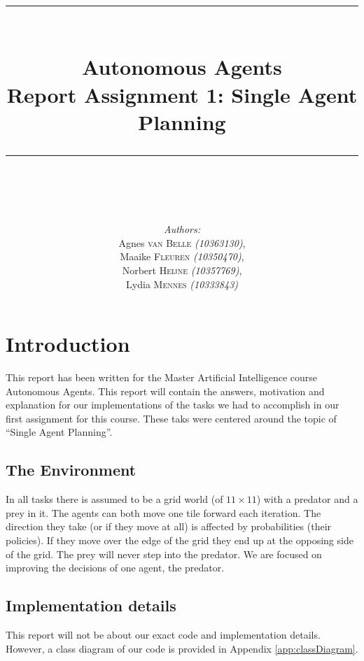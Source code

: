 \documentclass{article}
\newcommand{\HRule}{\rule{\linewidth}{0.1mm}}
\begin{document}
\title{ \HRule \\[0.2cm]
		Autonomous Agents\\ 
		Report Assignment 1: Single Agent Planning\\
		\HRule \\[0.1cm]
		}
		
\author{
		\emph{Authors:}\\[0.2cm]
		Agnes \textsc{van Belle} \small{ \emph{(10363130)}},\\ 
		Maaike \textsc{Fleuren} \small{ \emph{(10350470)}}, \\
		Norbert \textsc{Heijne} \small{ \emph{(10357769)}}, \\
		Lydia \textsc{Mennes} \small{ \emph{(10333843)}}
		}

 
\maketitle

\section{Introduction}
This report has been written for the Master Artificial Intelligence course Autonomous Agents. This report will contain the answers, motivation and explanation for our implementations of the tasks we had to accomplish in our first assignment for this course. These taks were centered around the topic of ``Single Agent Planning''. 

\subsection{The Environment}\label{environment}
In all tasks there is assumed to be a grid world (of $11 \times 11$) with a predator and a prey in it. The agents can both move one tile forward each iteration. The direction they take (or if they move at all) is affected by probabilities (their policies). If they move over the edge of the grid they end up at the opposing side of the grid. The prey will never step into the predator. We are focused on improving the decisions of one agent, the predator. 

\subsection{Implementation details}
This report will not be about our exact code and implementation details. However, a class diagram of our code is provided in Appendix \ref{app:classDiagram}.
\end{document}
